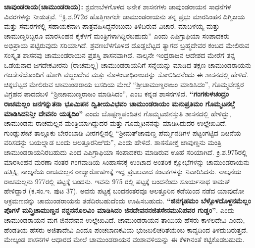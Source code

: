 \vskip 2pt

\textbf{ಚಾವುಂಡರಾಯ(ಚಾಮುಂಡರಾಯ): }ಶ್ರವಣಬೆಳಗೊಳದ ಅನೇಕ ಶಾಸನಗಳು ಚಾವುಂಡರಾಯನ ಸಾಧನೆಗಳ ವಿವರ\-ಗಳನ್ನು ನೀಡುತ್ತವೆ. “ಕ್ರಿ.ಶ.972ರ ಹೊತ್ತಿಗಾಗಲೇ ಚಾಮುಂಡರಾಯನು ತನ್ನ ಪ್ರಭು ಮಾರಸಿಂಹನ ದಿಗ್ವಿಜಯ ಮತ್ತು ಸಮರಗಳಲ್ಲಿ ಸಹಾಯಕನಾಗಿ ಪಾತ್ರವಹಿಸಿದ್ದನೆಂಬುದು ತಿಳಿದಿರುವ ವಿಚಾರ. ಮಾಬಳಯ್ಯ ಮತ್ತು ಚಾಮುಣ್ಡರಿಬ್ಬರೂ ಮಾರಸಿಂಹನ ಕೈಕೆಳಗೆ ಮಂತ್ರಿಗಳಾಗಿದ್ದಿರಬಹುದು” ಎಂದು ಎಪಿಗ್ರಾಫಿಯಾ ಸಂಪಾದಕರು ಅಭಿಪ್ರಾಯ ಪಟ್ಟಿರುವುದು ಸರಿಯಾಗಿದೆ. ಶ್ರವಣಬೆಳಗೊಳದ ದೊಡ್ಡಬೆಟ್ಟದ ತ್ಯಾಗದ ಬ್ರಹ್ಮದೇವರ ಕಂಬದ ಮೇಲಿರುವ ಸಂಸ್ಕೃತ ಶಾಸನವು ಚಾಮುಂಡರಾಯನ ಪ್ರಶಸ್ತಿ ಶಾಸನವಾಗಿದೆ. ನಾಲ್ಕನೇ ಇಂದ್ರರಾಜನ ಆದೇಶದ ಮೇರೆಗೆ ತನ್ನ ಒಡೆಯನಾದ ಜಗದೇಕವೀರನು (ರಾಚಮಲ್ಲ) ಚಾಮುಂಡರಾಯನಿಗೆ ಸನ್ನೆಯನ್ನು ಮಾಡಿದ ತಕ್ಷಣ ಚಾಮುಂಡರಾಯನು ಗಜಸೇನೆಯೊಂದಿಗೆ ಹೋಗಿ ವಜ್ಜಲದೇವ ಮತ್ತು ನೊಳಂಬಾಧಿರಾಜರನ್ನು ಸೋಲಿಸಿದನೆಂದು ಈ ಶಾಸನದಲ್ಲಿ ಹೇಳಿದೆ. ಚಿಕ್ಕಬೆಟ್ಟದ ಮೇಲಿರುವ ಚಾಮುಂಡರಾಯ ಬಸದಿಯ ಮೇಲೆ “ಶ‍್ರೀಚಾಮುಣ್ಡರಾಜಂ ಮಾಡಿಸಿದಂ”, ಗೊಮ್ಮಟೇಶ್ವರ ವಿಗ್ರಹದ ಪಾದದಬಳಿ “ಶ‍್ರೀಚಾಮುಣ್ಡರಾಜಂ ಮಾಡಿಸಿದಂ”, ಎಂಬ ಕನ್ನಡ ಶಾಸನಗಳಿದೆ. \textbf{“ಗಂಗಕುಳಚಂದ್ರಂ ರಾಚಮಲ್ಲಂ ಜನಗನ್ನುತನಾ ಭೂಮಿಪನ ದ್ವಿತೀಯವಿಭವಂ ಚಾಮುಂಡರಾಯಂ ಮನುಪ್ರತಿಮಂ ಗೊಮ್ಮಟನಲ್ತೆ ಮಾಡಿಸಿದನಿನ್ತೀ ದೇವನಂ ಯತ್ನದಿಂ”} ಎಂದು ಬೊಪ್ಪಣ್ಣಪಂಡಿತನ ಗೊಮ್ಮಟಜಿನಸ್ತುತಿ ಶಾಸನದಲ್ಲಿ ಹೇಳಿದ್ದು, ಚಾಮುಂಡನು ರಾಚಮಲ್ಲನ ಮಂತ್ರಿಯಾಗಿದ್ದುದರ ಮತ್ತು ಗೊಮ್ಮಟನನನ್ನು ಮಾಡಿಸಿದುದರ ಉಲ್ಲೇಖವಿದೆ. ಗುಂಡ್ಲುಪೇಟೆ ತಾಲ್ಲೂಕು ಬೇರಂಬಾಡಿ ವೀರಗಲ್ಲಿನಲ್ಲಿ “ಶ‍್ರೀಮತ್​ ಚಾವುಣ್ಡ ಪೆರ್ಮ್ಮನಡಿಗಳ ಪಟ್ಟಂಗಟ್ಟಿದ ಏೞನೆಯ ವರಿಸದನ್ದು ಬಯಲ್ನಾಡ ಬಂದು ಆಲತ್ತೂರನಿಱಿದು”, ಎಂದು ಹೇಳಿದೆ. ಶಾಸನೋಕ್ತ ಚಾವುಣ್ಡನು ಮಂತ್ರಿ ಚಾಮುಂಡರಾಯನಿರಬಹುದು ಎಂದ ಎಪಿಗ್ರಾಫಿಯಾ ಸಂಪಾದಕರು ಮಾಡಿರುವ ಊಹೆ ಸರಿಯಾಗಿದೆ. ಕ್ರಿ.ಶ.975ರಲ್ಲಿ ಮಾರಸಿಂಹನ ಮರಣಾ ನಂತರ ಗಂಗವಾಡಿಯ ಸಿಂಹಾಸನಕ್ಕೆ ಉಂಟಾದ ಅಂತರಿಕ ಕ್ಷೋಭೆಗಳನ್ನು ಚಾಮುಂಡರಾಯನು ಹತ್ತಿಕ್ಕಿ, ನಾಲ್ಕನೆಯ ರಾಚಮಲ್ಲನ ರಾಜ್ಯಾರೋಹಣಕ್ಕೆ ಇದ್ದ ಪ್ರಬಲವಾದ ಕಂಟಕಗಳನ್ನು ನಿವಾರಿಸಿದನು. ನಾಲ್ಕನೆಯ ರಾಚಮಲ್ಲನು 977ರಲ್ಲಿ ಪಟ್ಟಕ್ಕೆ ಬಂದನು. ಇವನು 975 ರಲ್ಲಿ ಪಟ್ಟಕ್ಕೆ ಬಂದನೆಂದು ಸೂರ್ಯನಾಥ ಕಾಮತ್ ಹೇಳಿದ್ದಾರೆ (ಕ.ಸಂ.ಇ. ಪುಟ 37). ಅವನು ಪಟ್ಟಕ್ಕೆ ಬಂದನಂತರವೂ ಆಲತ್ತೂರಿನ ಕಡೆಯಿಂದ ನಡೆದ ಯಾವುದೋ ಆಕ್ರಮಣವನ್ನು ಚಾಮುಂಡರಾಯನು ತಡೆದಿರಬಹುದೆಂದು ಊಹಿಸಬಹುದು. \textbf{“ಜಿನಗೃಹಮಂ ಬೆಳ್ಗೊಳದೊಳ್ಜನಮೆಲ್ಲಂ ಪೊಗಳೆ ಮನ್ತ್ರಿಚಾಮುಣ್ಡನ ನನ್ದನನೊಲವಿಂ ಮಾಡಿಸಿದಂ ಜಿನದೇವನನಜಿತಸೇನಮುನಿಪವರ ಗುಡ್ಡಂ”}. ಎಂದು ಚಾಮುಂಡರಾಯನ ಮಗ ಜಿನದೇವನ ಉಲ್ಲೇಖವಿದೆ. ಚಾಮುಂಡರಾಯನ ತಾಯಿಯ ಹೆಸರು ಕಾಳಲದೇವಿ ಎಂದು, ಹೆಂಡತಿಯ ಹೆಸರು ಅಜಿತಾದೇವಿ ಎಂದೂ ಪಂಚಬಾಣಕವಿಯ ಭುಜಬಲಿಚರಿತೆಯೆಂಬ ಕಾವ್ಯದಿಂದ ತಿಳದುಬರುತ್ತದೆ. ಮೇಲ್ಕಂಡ ಶಾಸನಗಳ ಆಧಾರದ ಮೇಲೆ ಚಾಮುಂಡರಾಯನ ವಂಶಾವಳಿಯನ್ನು ಈ ಕೆಳಗಿನಂತೆ ಕಟ್ಟಿಕೊಡಬಹುದು.

